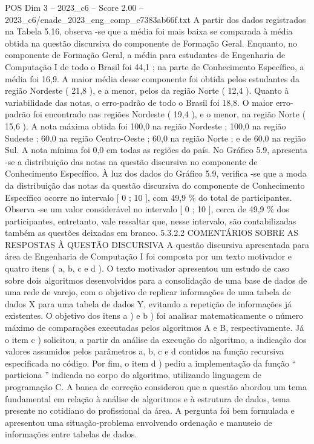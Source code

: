 \begin{textsample}{POS Dim 3 – 2023\_c6 – Score 2.00 – 2023\_c6/enade\_2023\_eng\_comp\_e7383ab66f.txt}
A partir dos dados registrados na Tabela 5.16, observa -se que a média foi mais baixa se comparada à média obtida na questão discursiva do componente de Formação Geral.
Enquanto, no componente de Formação Geral, a média para estudantes de Engenharia de Computação I de todo o Brasil foi 44,1 ; na parte de Conhecimento Específico, a média foi 16,9.
A maior média desse componente foi obtida pelos estudantes da região Nordeste ( 21,8 ), e a menor, pelos da região Norte ( 12,4 ).
Quanto à variabilidade das notas, o erro-padrão de todo o Brasil foi 18,8.
O maior erro-padrão foi encontrado nas regiões Nordeste ( 19,4 ), e o menor, na região Norte ( 15,6 ).
A nota máxima obtida foi 100,0 na região Nordeste ; 100,0 na região Sudeste ; 60,0 na região Centro-Oeste ; 60,0 na região Norte ; e de 60,0 na região Sul.
A nota mínima foi 0,0 em todas as regiões do país.
No Gráfico 5.9, apresenta -se a distribuição das notas na questão discursiva no componente de Conhecimento Específico.
À luz dos dados do Gráfico 5.9, verifica -se que a moda da distribuição das notas da questão discursiva do componente de Conhecimento Específico ocorre no intervalo [ 0 ; 10 ], com 49,9 \% do total de participantes.
Observa -se um valor considerável no intervalo [ 0 ; 10 ], cerca de 49,9 \% dos participantes, entretanto, vale ressaltar que, nesse intervalo, são contabilizadas também as questões deixadas em branco. 5.3.2.2 COMENTÁRIOS SOBRE AS RESPOSTAS À QUESTÃO DISCURSIVA A questão discursiva apresentada para área de Engenharia de Computação I foi composta por um texto motivador e quatro itens ( a, b, c e d ).
O texto motivador apresentou um estudo de caso sobre dois algoritmos desenvolvidos para a consolidação de uma base de dados de uma rede de varejo, com o objetivo de replicar informações de uma tabela de dados X para uma tabela de dados Y, evitando a repetição de informações já existentes.
O objetivo dos itens a ) e b ) foi analisar matematicamente o número máximo de comparações executadas pelos algoritmos A e B, respectivamente.
Já o item c ) solicitou, a partir da análise da execução do algoritmo, a indicação dos valores assumidos pelos parâmetros a, b, c e d contidos na função recursiva especificada no código.
Por fim, o item d ) pediu a implementação da função “ particiona ” indicada no corpo do algoritmo, utilizando linguagem de programação C.
A banca de correção considerou que a questão abordou um tema fundamental em relação à análise de algoritmos e à estrutura de dados, tema presente no cotidiano do profissional da área.
A pergunta foi bem formulada e apresentou uma situação-problema envolvendo ordenação e manuseio de informações entre tabelas de dados.

\end{textsample}
